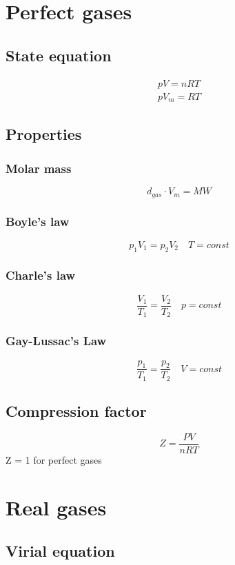 \documentclass[a4paper]{report}
\begin{document}
  \begin{multicols}{2}

    \section{Perfect gases}
        \subsection{State equation}
      \begin{gather*}
        pV = nRT\\
        pV_{m} = RT
      \end{gather*}
        \subsection{Properties}
        \subsubsection{Molar mass}  
         $$ d_{gas} \cdot V_{m} = MW $$
        \subsubsection{Boyle's law}
        $$ p_1 V_1 = p_2 V_2 \quad T = const$$ 
        \subsubsection{Charle's law}
        $$ \frac{V_1}{T_1} = \frac{V_2}{T_2} \quad p = const $$ 
        \subsubsection{Gay-Lussac's Law}
        $$ \frac{p_1}{T_1} = \frac{p_2}{T_2} \quad V = const $$

        \subsection{Compression factor}
        $$ Z = \frac{PV}{nRT} $$
        Z = 1 for perfect gases 
    \section{Real gases}
        \subsection{Virial equation}


\end{multicols}
\end{document}

